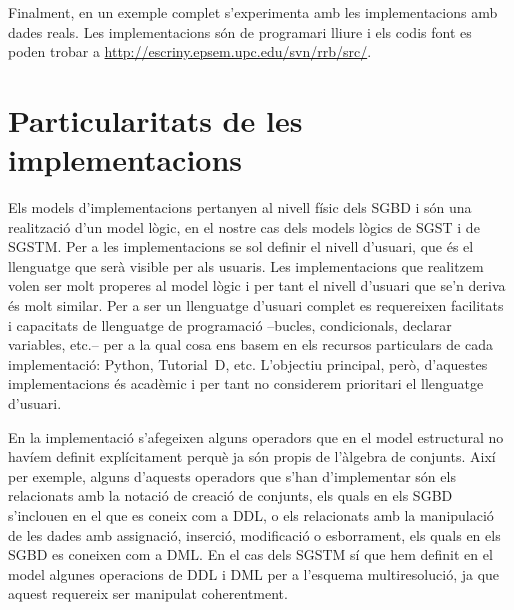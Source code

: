 Finalment, en un exemple complet s'experimenta amb les implementacions
amb dades reals. Les implementacions són de programari lliure i els
codis font es poden trobar a
\url{http://escriny.epsem.upc.edu/svn/rrb/src/}.










\section{Particularitats de les implementacions}



Els models d'implementacions pertanyen al nivell físic dels \gls{SGBD}
i són una realització d'un model lògic, en el nostre cas dels models
lògics de \gls{SGST} i de \gls{SGSTM}. Per a les implementacions se
sol definir el nivell d'usuari, que és el llenguatge que serà visible
per als usuaris. Les implementacions que realitzem volen ser molt
properes al model lògic i per tant el nivell d'usuari que se'n deriva
és molt similar. Per a ser un llenguatge d'usuari complet es
requereixen facilitats i capacitats de llenguatge de programació
--bucles, condicionals, declarar variables, etc.-- per a la qual
cosa ens basem en els recursos particulars de cada implementació:
Python, Tutorial~D, etc. L'objectiu principal, però, d'aquestes
implementacions és acadèmic i per tant no considerem prioritari el
llenguatge d'usuari.




En la implementació s'afegeixen alguns operadors que en el model
estructural no havíem definit explícitament perquè ja són propis de
l'àlgebra de conjunts. Així per exemple, alguns d'aquests operadors
que s'han d'implementar són els relacionats amb la notació de creació
de conjunts, %
els quals en els \gls{SGBD} s'inclouen en el que es coneix com a
\gls{DDL}, o els relacionats amb la manipulació de les dades amb
assignació, inserció, modificació o esborrament, els quals en els
\gls{SGBD} es coneixen com a \gls{DML}.  En el cas dels \gls{SGSTM} sí
que hem definit en el model algunes operacions de \gls{DDL} i \gls{DML} per a
l'esquema multiresolució, ja que aquest requereix ser manipulat
coherentment.






